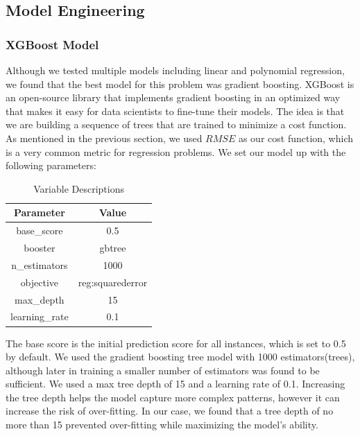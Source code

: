 \documentclass[12pt]{article}
\begin{document}
\subsection{Model Engineering}
\subsubsection{XGBoost Model}
Although we tested multiple models including linear and polynomial regression, we found that the best model for this problem was gradient boosting.
XGBoost is an open-source library that implements gradient boosting in an optimized way that makes it easy for data scientists to fine-tune their models\cite{xgboostInfo}.
The idea is that we are building a sequence of trees that are trained to minimize a cost function.
As mentioned in the previous section, we used $RMSE$ as our cost function, which is a very common metric for regression problems.
We set our model up with the following parameters:
\begin{table}[H]
\centering
\begin{tabular}{|c|c|}
\hline
\textbf{Parameter} & \textbf{Value} \\ \hline
base\_score & 0.5 \\ \hline
booster & gbtree \\ \hline
n\_estimators & 1000 \\ \hline
objective & reg:squarederror \\ \hline
max\_depth & 15 \\ \hline
learning\_rate & 0.1 \\ \hline
\end{tabular}
\caption{Variable Descriptions}
\end{table}
The base score is the initial prediction score for all instances, which is set to 0.5 by default\cite{xgboostDocs}.
We used the gradient boosting tree model with 1000 estimators(trees), although later in training a smaller number of estimators was found to be sufficient.
We used a max tree depth of 15 and a learning rate of 0.1.
Increasing the tree depth helps the model capture more complex patterns, however it can increase the risk of over-fitting\cite{xgboostDocs}.
In our case, we found that a tree depth of no more than 15 prevented over-fitting while maximizing the model's ability.
\end{document}
